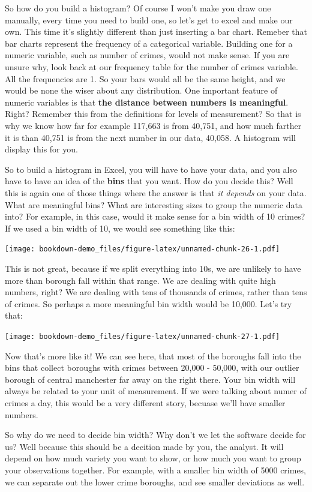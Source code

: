 \documentclass[]{book}
\theoremstyle{definition}
\theoremstyle{definition}
\theoremstyle{definition}
\theoremstyle{remark}
\begin{document}
So how do you build a histogram? Of course I won't make you draw one
manually, every time you need to build one, so let's get to excel and
make our own. This time it's slightly different than just inserting a
bar chart. Remeber that bar charts represent the frequency of a
categorical variable. Building one for a numeric variable, such as
number of crimes, would not make sense. If you are unsure why, look back
at our frequency table for the number of crimes variable. All the
frequencies are 1. So your bars would all be the same height, and we
would be none the wiser about any distribution. One important feature of
numeric variables is that \textbf{the distance between numbers is
meaningful}. Right? Remember this from the definitions for levels of
measurement? So that is why we know how far for example 117,663 is from
40,751, and how much farther it is than 40,751 is from the next number
in our data, 40,058. A histogram will display this for you.

 So to build a histogram in Excel, you will have to have your data, and
you also have to have an idea of the \textbf{bins} that you want. How do
you decide this? Well this is again one of those things where the answer
is that \emph{it depends} on your data. What are meaningful bins? What
are interesting sizes to group the numeric data into? For example, in
this case, would it make sense for a bin width of 10 crimes? If we used
a bin width of 10, we would see something like this:

\texttt{[image: bookdown-demo\_files/figure-latex/unnamed-chunk-26-1.pdf]}

This is not great, because if we split everything into 10s, we are
unlikely to have more than borough fall within that range. We are
dealing with quite high numbers, right? We are dealing with tens of
thousands of crimes, rather than tens of crimes. So perhaps a more
meaningful bin width would be 10,000. Let's try that:

\texttt{[image: bookdown-demo\_files/figure-latex/unnamed-chunk-27-1.pdf]}

Now that's more like it! We can see here, that most of the boroughs fall
into the bins that collect boroughs with crimes between 20,000 - 50,000,
with our outlier borough of central manchester far away on the right
there. Your bin width will always be related to your unit of
measurement. If we were talking about numer of crimes a day, this would
be a very different story, becuase we'll have smaller numbers.

So why do we need to decide bin width? Why don't we let the software
decide for us? Well because this should be a decition made by you, the
analyst. It will depend on how much variety you want to show, or how
much you want to group your observations together. For example, with a
smaller bin width of 5000 crimes, we can separate out the lower crime
boroughs, and see smaller deviations as well.
\end{document}
